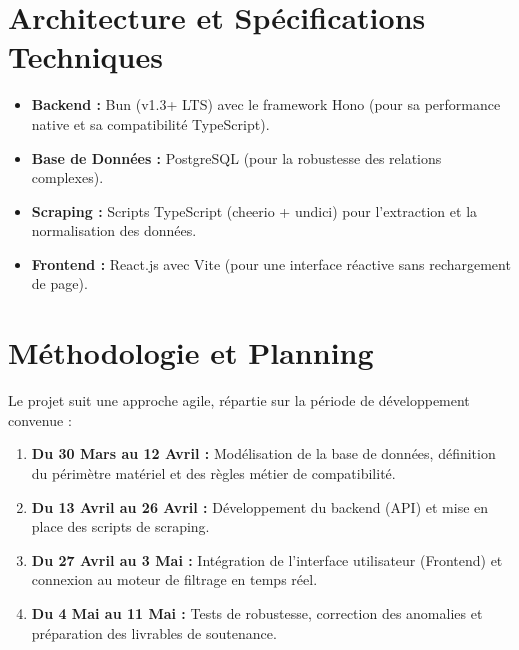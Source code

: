 \documentclass[12pt,a4paper]{article}
\begin{document}
\section{Architecture et Spécifications Techniques}
\begin{itemize}[label=\textbullet]
\item \textbf{Backend :} Bun (v1.3+ LTS) avec le framework Hono (pour sa performance native et sa compatibilité TypeScript).
\item \textbf{Base de Données :} PostgreSQL (pour la robustesse des relations complexes).
\item \textbf{Scraping :} Scripts TypeScript (cheerio + undici) pour l'extraction et la normalisation des données.
\item \textbf{Frontend :} React.js avec Vite (pour une interface réactive sans rechargement de page).
\end{itemize}

\section{Méthodologie et Planning}
Le projet suit une approche agile, répartie sur la période de développement convenue :
\begin{enumerate}
\item \textbf{Du 30 Mars au 12 Avril :} Modélisation de la base de données, définition du périmètre matériel et des règles métier de compatibilité.
\item \textbf{Du 13 Avril au 26 Avril :} Développement du backend (API) et mise en place des scripts de scraping.
\item \textbf{Du 27 Avril au 3 Mai :} Intégration de l'interface utilisateur (Frontend) et connexion au moteur de filtrage en temps réel.
\item \textbf{Du 4 Mai au 11 Mai :} Tests de robustesse, correction des anomalies et préparation des livrables de soutenance.
\end{enumerate}
\end{document}
